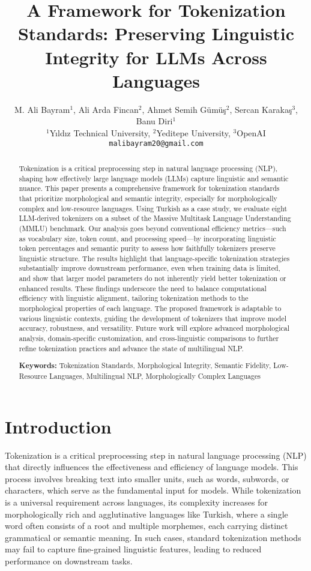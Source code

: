 \documentclass{article}
\title{A Framework for Tokenization Standards: Preserving Linguistic Integrity for LLMs Across Languages}
\author{
M. Ali Bayram$^1$, Ali Arda Fincan$^2$, Ahmet Semih Gümüş$^2$, Sercan Karakaş$^3$, Banu Diri$^1$\\
$^1$Yıldız Technical University, $^2$Yeditepe University, $^3$OpenAI \\
\texttt{malibayram20@gmail.com}
}
\begin{document}
\maketitle

\begin{abstract}
  Tokenization is a critical preprocessing step in natural language processing (NLP), shaping how effectively large language models (LLMs) capture linguistic and semantic nuance. This paper presents a comprehensive framework for tokenization standards that prioritize morphological and semantic integrity, especially for morphologically complex and low-resource languages. Using Turkish as a case study, we evaluate eight LLM-derived tokenizers on a subset of the Massive Multitask Language Understanding (MMLU) benchmark. Our analysis goes beyond conventional efficiency metrics—such as vocabulary size, token count, and processing speed—by incorporating linguistic token percentages and semantic purity to assess how faithfully tokenizers preserve linguistic structure. The results highlight that language-specific tokenization strategies substantially improve downstream performance, even when training data is limited, and show that larger model parameters do not inherently yield better tokenization or enhanced results. These findings underscore the need to balance computational efficiency with linguistic alignment, tailoring tokenization methods to the morphological properties of each language. The proposed framework is adaptable to various linguistic contexts, guiding the development of tokenizers that improve model accuracy, robustness, and versatility. Future work will explore advanced morphological analysis, domain-specific customization, and cross-linguistic comparisons to further refine tokenization practices and advance the state of multilingual NLP.
  
  \textbf{Keywords:} Tokenization Standards, Morphological Integrity, Semantic Fidelity, Low-Resource Languages, Multilingual NLP, Morphologically Complex Languages
  \end{abstract}
  \section{Introduction}

  Tokenization is a critical preprocessing step in natural language processing (NLP) that directly influences the effectiveness and efficiency of language models. This process involves breaking text into smaller units, such as words, subwords, or characters, which serve as the fundamental input for models. While tokenization is a universal requirement across languages, its complexity increases for morphologically rich and agglutinative languages like Turkish, where a single word often consists of a root and multiple morphemes, each carrying distinct grammatical or semantic meaning. In such cases, standard tokenization methods may fail to capture fine-grained linguistic features, leading to reduced performance on downstream tasks.
  
\end{document}
